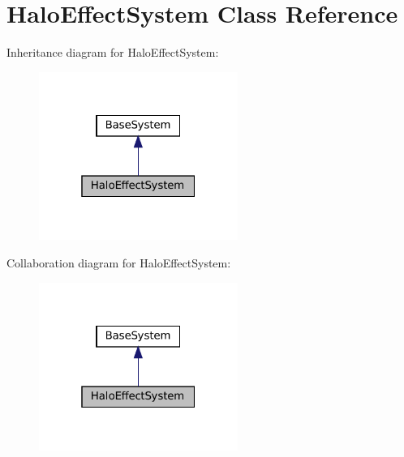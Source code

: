 \hypertarget{classHaloEffectSystem}{}\section{Halo\+Effect\+System Class Reference}
\label{classHaloEffectSystem}


Inheritance diagram for Halo\+Effect\+System\+:
\nopagebreak
\begin{figure}[H]
\begin{center}
\leavevmode
\includegraphics[width=184pt]{classHaloEffectSystem__inherit__graph}
\end{center}
\end{figure}


Collaboration diagram for Halo\+Effect\+System\+:
\nopagebreak
\begin{figure}[H]
\begin{center}
\leavevmode
\includegraphics[width=184pt]{classHaloEffectSystem__coll__graph}
\end{center}
\end{figure}
